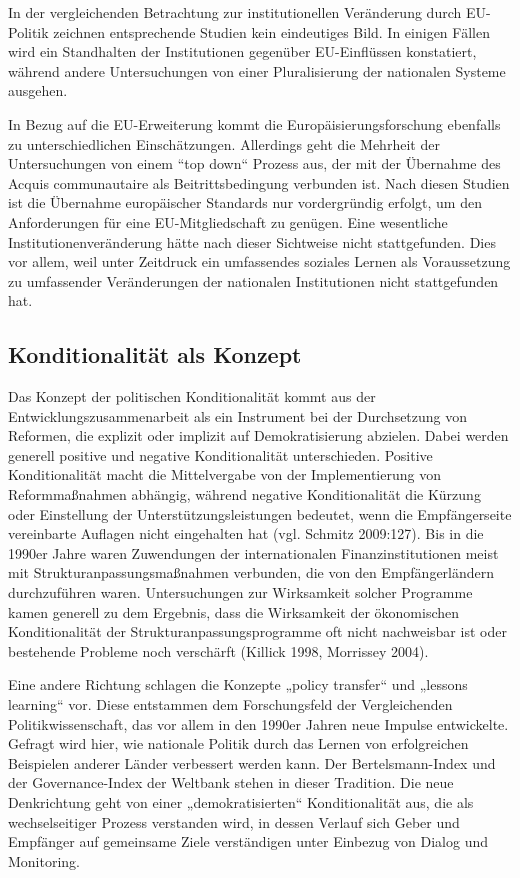 \par
In der vergleichenden Betrachtung zur institutionellen Veränderung durch EU-Politik zeichnen entsprechende Studien kein eindeutiges Bild. In einigen Fällen wird ein Standhalten der Institutionen gegenüber EU-Einflüssen konstatiert, während andere Untersuchungen von einer Pluralisierung der nationalen Systeme ausgehen.\par
In Bezug auf die EU-Erweiterung kommt die Europäisierungsforschung ebenfalls zu unterschiedlichen Einschätzungen. Allerdings geht die Mehrheit der Untersuchungen von einem “top down“ Prozess aus, der mit der Übernahme des Acquis communautaire als Beitrittsbedingung verbunden ist. Nach diesen Studien ist die Übernahme europäischer Standards nur vordergründig erfolgt, um den Anforderungen für eine EU-Mitgliedschaft zu genügen. Eine wesentliche Institutionenveränderung hätte nach dieser Sichtweise nicht stattgefunden. Dies vor allem, weil unter Zeitdruck ein umfassendes soziales Lernen als Voraussetzung zu umfassender Veränderungen der nationalen Institutionen nicht stattgefunden hat.
\subsection{Konditionalität als Konzept}
Das Konzept der politischen Konditionalität kommt aus der Entwicklungszusammenarbeit als ein Instrument bei der Durchsetzung von Reformen, die explizit oder implizit auf Demokratisierung abzielen. Dabei werden generell positive und negative Konditionalität unterschieden. Positive Konditionalität macht die Mittelvergabe von der Implementierung von Reformmaßnahmen abhängig, während negative Konditionalität die Kürzung oder Einstellung der Unterstützungsleistungen bedeutet, wenn die Empfängerseite vereinbarte Auflagen nicht eingehalten hat (vgl. Schmitz 2009:127). Bis in die 1990er Jahre waren Zuwendungen der internationalen Finanzinstitutionen meist mit Strukturanpassungsmaßnahmen verbunden, die von den Empfängerländern durchzuführen waren. Untersuchungen zur Wirksamkeit solcher Programme kamen generell zu dem Ergebnis, dass die Wirksamkeit der ökonomischen Konditionalität der Strukturanpassungsprogramme oft nicht nachweisbar ist oder bestehende Probleme noch verschärft (Killick 1998, Morrissey 2004). 
\par
Eine andere Richtung schlagen die Konzepte „policy transfer“ und „lessons learning“ vor. Diese entstammen dem Forschungsfeld der Vergleichenden Politikwissenschaft, das vor allem in den 1990er Jahren neue Impulse entwickelte. Gefragt wird hier, wie nationale Politik durch das Lernen von erfolgreichen Beispielen anderer Länder verbessert werden kann. Der Bertelsmann-Index und der Governance-Index der Weltbank stehen in dieser Tradition. Die neue Denkrichtung geht von einer „demokratisierten“ Konditionalität aus, die als wechselseitiger Prozess verstanden wird, in dessen Verlauf sich Geber und Empfänger auf gemeinsame Ziele verständigen unter Einbezug von Dialog und Monitoring.
